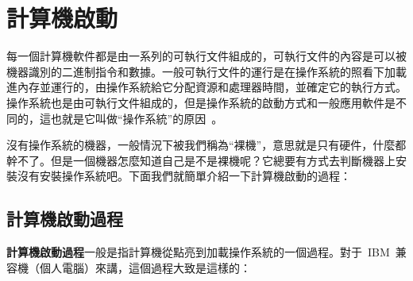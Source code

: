 \chapter{計算機啟動} \label{CHboot}

每一個計算機軟件都是由一系列的可執行文件組成的，可執行文件的內容是可以被機器識別的二進制指令和數據。一般可執行文件的運行是在操作系統的照看下加載進內存並運行的，由操作系統給它分配資源和處理器時間，並確定它的執行方式。操作系統也是由可執行文件組成的，但是操作系統的啟動方式和一般應用軟件是不同的，這也就是它叫做“操作系統”的原因~\smiley。

沒有操作系統的機器，一般情況下被我們稱為“裸機”，意思就是只有硬件，什麼都幹不了。但是一個機器怎麼知道自己是不是裸機呢？它總要有方式去判斷機器上安裝沒有安裝操作系統吧。下面我們就簡單介紹一下計算機啟動的過程：

\section{計算機啟動過程} \label{CHboot_boot}

\textbf{計算機啟動過程}一般是指計算機從點亮到加載操作系統的一個過程。對于~IBM~兼容機（個人電腦）來講，這個過程大致是這樣的：


